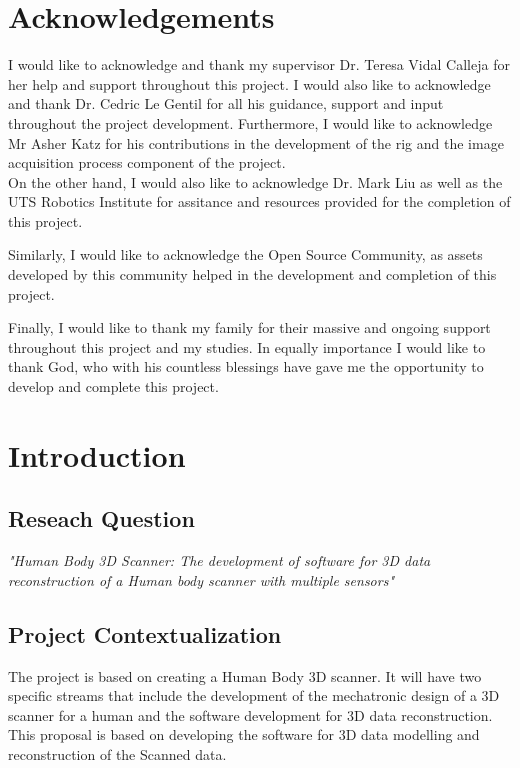 \documentclass[12pt]{report}
\begin{document}
\chapter*{Acknowledgements}
I would like to acknowledge and thank my supervisor Dr. Teresa Vidal Calleja for her help and support throughout this project. I would also like to acknowledge and thank Dr. Cedric Le Gentil for all his guidance, support and input throughout the project development.
Furthermore, I would like to acknowledge Mr Asher Katz for his contributions in the development of the rig  and the image acquisition process component of the project.\\
On the other hand, I would also like to acknowledge Dr. Mark Liu as well as the UTS Robotics Institute for assitance and resources provided for the completion of this project.

Similarly, I would like to acknowledge the Open Source Community, as assets developed by this community helped in the development and completion of this project.

Finally, I would like to thank my family for their massive and ongoing support throughout this project and my studies. In equally importance I would like to thank God, who with his countless blessings have gave me the opportunity to develop and complete this project.
\tableofcontents
\listoffigures
\listoftables

\newpage
\setcounter{page}{1}

\chapter{Introduction}

\section{Reseach Question}
\textit{\large{"Human Body 3D Scanner: The development of software for 3D data reconstruction of a Human body scanner with multiple sensors" }}

\section{Project Contextualization}
The project is based on creating a Human Body 3D scanner.
It will have two specific streams that include the development of the mechatronic design of a 3D scanner for a human and the software development for 3D data reconstruction. 
This proposal is based on developing the software for 3D data modelling and reconstruction of the Scanned data.
\end{document}
